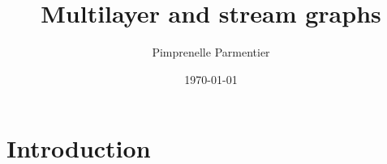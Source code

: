 \documentclass[15pt]{beamer}
\title{Multilayer and stream graphs} %
\author{Pimprenelle Parmentier} %
\date{\today} %
\begin{document}
\begin{frame}
\titlepage %
\end{frame}




\section{Introduction} %
\end{document}
